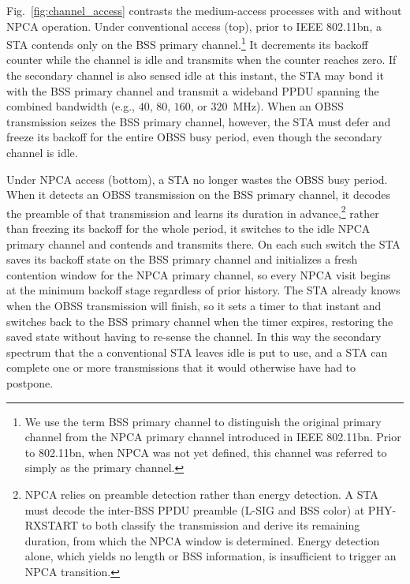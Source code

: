 \documentclass[conference]{IEEEtran}
\begin{document}
Fig.~\ref{fig:channel_access} contrasts the medium-access processes with and without NPCA operation. Under conventional access (top), prior to IEEE 802.11bn, a STA contends only on the BSS primary channel.\footnote{We use the term BSS primary channel to distinguish the original primary channel from the NPCA primary channel introduced in IEEE 802.11bn. Prior to 802.11bn, when NPCA was not yet defined, this channel was referred to simply as the primary channel.} It decrements its backoff counter while the channel is idle and transmits when the counter reaches zero. If the secondary channel is also sensed idle at this instant, the STA may bond it with the BSS primary channel and transmit a wideband PPDU spanning the combined bandwidth (e.g., $40$, $80$, $160$, or $320$~MHz). When an OBSS transmission seizes the BSS primary channel, however, the STA must defer and freeze its backoff for the entire OBSS busy period, even though the secondary channel is idle.

Under NPCA access (bottom), a STA no longer wastes the OBSS busy period. When it detects an OBSS transmission on the BSS primary channel, it decodes the preamble of that transmission and learns its duration in advance,\footnote{NPCA relies on preamble detection rather than energy detection. A STA must decode the inter-BSS PPDU preamble (L-SIG and BSS color) at PHY-RXSTART to both classify the transmission and derive its remaining duration, from which the NPCA window is determined. Energy detection alone, which yields no length or BSS information, is insufficient to trigger an NPCA transition.} rather than freezing its backoff for the whole period, it switches to the idle NPCA primary channel and contends and transmits there. On each such switch the STA saves its backoff state on the BSS primary channel and initializes a fresh contention window for the NPCA primary channel, so every NPCA visit begins at the minimum backoff stage regardless of prior history. The STA already knows when the OBSS transmission will finish, so it sets a timer to that instant and switches back to the BSS primary channel when the timer expires, restoring the saved state without having to re-sense the channel. In this way the secondary spectrum that the a conventional STA leaves idle is put to use, and a STA can complete one or more transmissions that it would otherwise have had to postpone.
\end{document}
